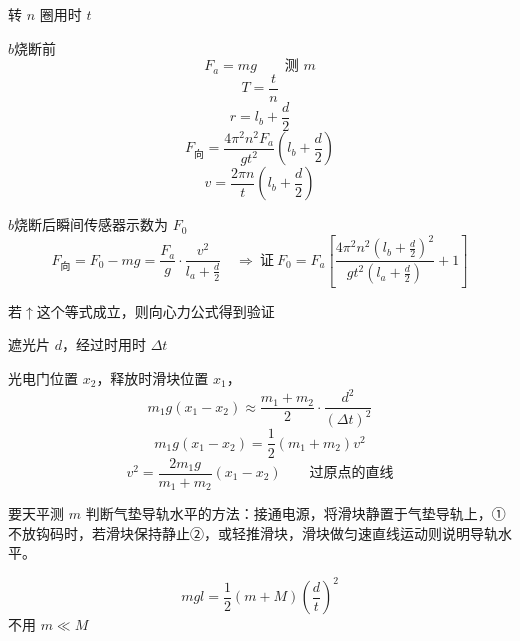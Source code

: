 

转 $n$ 圈用时 $t$

$b$烧断前
\[ F_a=mg\qquad \text{测 }m \]
\[ T=\frac{t}{n} \]
\[ r=l_b+\frac{d}{2} \]
\[ F_{\text{向}}=\frac{4\pi^2n^2F_a}{gt^2}\left(l_b+\frac{d}{2}\right) \]
\[ v=\frac{2\pi n}{t}\left(l_b+\frac{d}{2}\right) \]

$b$烧断后\quad 瞬间传感器示数为 $F_0$
\[ F_{\text{向}}=F_0-mg=\frac{F_a}{g}\cdot\frac{v^2}{l_a+\frac{d}{2}}\quad\Rightarrow\ \text{证}\ F_0=F_a\left[\frac{4\pi^2n^2\left(l_b+\frac{d}{2}\right)^2}{gt^2\left(l_a+\frac{d}{2}\right)}+1\right] \]

若$\uparrow$这个等式成立，则向心力公式得到验证

遮光片 $d$，经过时用时 $\Delta t$ %

光电门位置 $x_2$，释放时滑块位置 $x_1$，
\[ m_1g(x_1-x_2)\approx\frac{m_1+m_2}{2}\cdot\frac{d^2}{(\Delta t)^2} \]
\[ m_1g(x_1-x_2)=\frac12(m_1+m_2)v^2 \]
\[ v^2=\frac{2m_1g}{m_1+m_2}(x_1-x_2)\qquad\text{过原点的直线} \]

要天平测 $m$
判断气垫导轨水平的方法：接通电源，将滑块静置于气垫导轨上，①不放钩码时，若滑块保持静止②，或轻推滑块，滑块做匀速直线运动则说明导轨水平。 %

\[ mgl=\frac12(m+M)\left(\frac{d}{t}\right)^2 \]
不用 $m\ll M$

